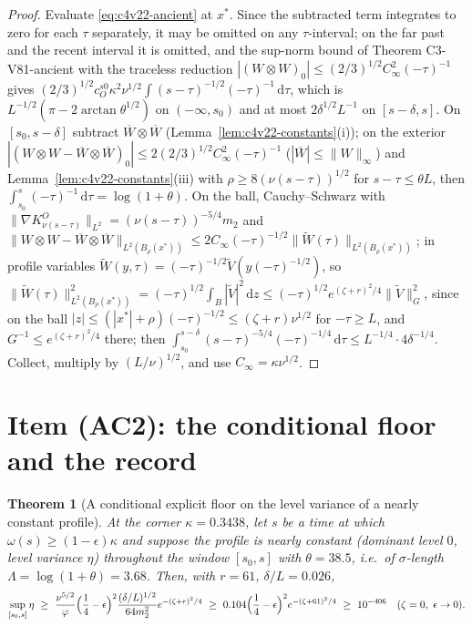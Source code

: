 \documentclass[11pt]{article}
\newcommand{\dd}{\,\mathrm d}
\theoremstyle{plain}
\newtheorem{theorem}{Theorem}[section]
\theoremstyle{definition}
\theoremstyle{remark}
\begin{document}
\begin{proof}
Evaluate \eqref{eq:c4v22-ancient} at \(x^*\).  Since the subtracted term
integrates to zero for each \(\tau\) separately, it may be omitted on any
\(\tau\)-interval; on the far past and the recent interval it is omitted,
and the sup-norm bound of Theorem C3-V81-ancient with the traceless
reduction \(|(W\otimes W)_0|\le(2/3)^{1/2}C_\infty^2(-\tau)^{-1}\) gives
\((2/3)^{1/2}c_O^{s0}\kappa^2\nu^{1/2}\int(s-\tau)^{-1/2}(-\tau)^{-1}\dd\tau\), which
is \(L^{-1/2}(\pi-2\arctan\theta^{1/2})\) on \((-\infty,s_0)\) and at most \(2\delta^{1/2}L^{-1}\) on \([s-\delta,s]\).
On \([s_0,s-\delta]\) subtract \(\overline W\otimes\overline W\) (Lemma~\ref{lem:c4v22-constants}(i)); on the
exterior \(|(W\otimes W-\overline W\otimes\overline W)_0|\le2(2/3)^{1/2}C_\infty^2(-\tau)^{-1}\) (\(|\overline W|\le\|W\|_\infty\)) and
Lemma~\ref{lem:c4v22-constants}(iii) with \(\rho\ge8(\nu(s-\tau))^{1/2}\) for \(s-\tau\le\theta L\), then
\(\int_{s_0}^s(-\tau)^{-1}\dd\tau=\log(1+\theta)\).  On the ball, Cauchy--Schwarz with
\(\|\nabla K^O_{\nu(s-\tau)}\|_{L^2}=(\nu(s-\tau))^{-5/4}m_2\) and
\(\|W\otimes W-\overline W\otimes\overline W\|_{L^2(B_\rho(x^*))}\le2C_\infty(-\tau)^{-1/2}\|\widetilde W(\tau)\|_{L^2(B_\rho(x^*))}\); in profile
variables \(\widetilde W(y,\tau)=(-\tau)^{-1/2}\widetilde V(y(-\tau)^{-1/2})\), so
\(\|\widetilde W(\tau)\|_{L^2(B_\rho(x^*))}^2=(-\tau)^{1/2}\int_{B}|\widetilde V|^2\dd z\le(-\tau)^{1/2}e^{(\zeta+r)^2/4}\|\widetilde V\|_G^2\), since on the
ball \(|z|\le(|x^*|+\rho)(-\tau)^{-1/2}\le(\zeta+r)\nu^{1/2}\) for \(-\tau\ge L\), and \(G^{-1}\le e^{(\zeta+r)^2/4}\) there;
then \(\int_{s_0}^{s-\delta}(s-\tau)^{-5/4}(-\tau)^{-1/4}\dd\tau\le L^{-1/4}\cdot4\delta^{-1/4}\).  Collect, multiply by
\((L/\nu)^{1/2}\), and use \(C_\infty=\kappa\nu^{1/2}\).
\end{proof}

\section{Item (AC2): the conditional floor and the record}
\label{sec:c4v22-floor}

\begin{theorem}[A conditional explicit floor on the level variance of a nearly constant profile]
\label{thm:c4v22-floor}
At the corner \(\kappa=0.3438\), let \(s\) be a time at which \(\omega(s)\ge(1-\epsilon)\kappa\) and
suppose the profile is nearly constant (dominant level \(0\), level
variance \(\eta\)) throughout the window \([s_0,s]\) with \(\theta=38.5\), i.e.\ of
\(\sigma\)-length \(\Lambda=\log(1+\theta)=3.68\).  Then, with \(r=61\), \(\delta/L=0.026\),
\begin{equation}
 \sup_{[s_0,s]}\eta\ \ge\ \frac{\nu^{5/2}}{\varphi}\Bigl(\frac14-\epsilon\Bigr)^2\frac{(\delta/L)^{1/2}}{64m_2^2}e^{-(\zeta+r)^2/4}
 \ \ge\ 0.104\Bigl(\frac14-\epsilon\Bigr)^2e^{-(\zeta+61)^2/4}
 \ \ge\ 10^{-406}\quad(\zeta=0,\ \epsilon\to0).
 \label{eq:c4v22-floor}
\end{equation}
\end{theorem}
\end{document}
